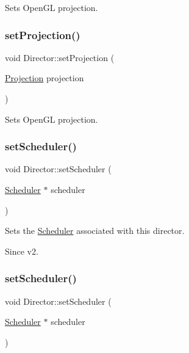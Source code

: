 Sets Open\+GL projection. \mbox{\label{classDirector_a4cffcad9b7c5cbb16e5e0780ab5401b9}} 
\subsubsection{\texorpdfstring{set\+Projection()}{setProjection()}\hspace{0.1cm}{\footnotesize\ttfamily [2/2]}}
{\footnotesize\ttfamily void Director\+::set\+Projection (\begin{DoxyParamCaption}\item[{\hyperlink{classDirector_aaa3d9a0eac7c805d87ecba67c974fcf2}{Projection}}]{projection }\end{DoxyParamCaption})}

Sets Open\+GL projection. \mbox{\label{classDirector_a8e802ef200191e7b6e92b08b37c81e4d}} 
\subsubsection{\texorpdfstring{set\+Scheduler()}{setScheduler()}\hspace{0.1cm}{\footnotesize\ttfamily [1/2]}}
{\footnotesize\ttfamily void Director\+::set\+Scheduler (\begin{DoxyParamCaption}\item[{\hyperlink{classScheduler}{Scheduler} $\ast$}]{scheduler }\end{DoxyParamCaption})}

Sets the \hyperlink{classScheduler}{Scheduler} associated with this director. \begin{DoxySince}{Since}
v2. 
\end{DoxySince}
\mbox{\label{classDirector_a8e802ef200191e7b6e92b08b37c81e4d}} 
\subsubsection{\texorpdfstring{set\+Scheduler()}{setScheduler()}\hspace{0.1cm}{\footnotesize\ttfamily [2/2]}}
{\footnotesize\ttfamily void Director\+::set\+Scheduler (\begin{DoxyParamCaption}\item[{\hyperlink{classScheduler}{Scheduler} $\ast$}]{scheduler }\end{DoxyParamCaption})}

